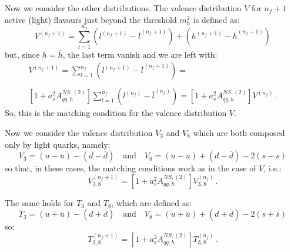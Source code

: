 \documentclass[10pt,a4paper]{article}
\begin{document}
Now we consider the other distributions. The valence distribution $V$
for $n_f+1$ active (light) flavours just beyond the threshold $m_h^2$
is defined as:
\begin{equation}
V^{(n_f+1)}=\sum_{l=1}^{n_f}(l^{(n_f+1)}-\overline{l}^{(n_f+1)})+(h^{(n_f+1)}-\overline{h}^{(n_f+1)})
\end{equation}
but, since $h=\overline{h}$, the last term vanish and we are left with:
\begin{equation}
\begin{array}{c}
\displaystyle V^{(n_f+1)}=\sum_{l=1}^{n_f}(l^{(n_f+1)}-\overline{l}^{(n_f+1)})=\\
\\
\displaystyle [1+a_s^2A_{qq,h}^{N\!S,(2)}]\sum_{l=1}^{n_f}(l^{(n_f)}-\overline{l}^{(n_f)})=[1+a_s^2A_{qq,h}^{N\!S,(2)}]V^{(n_f)}\,.
\end{array}
\label{valence}
\end{equation}
So, this is the matching condition for the valence distribution $V$.

Now we consider the valence distribution $V_3$ and $V_8$ which are
both composed only by light quarks, namely:
\begin{equation}
V_3=(u-\overline{u})-(d-\overline{d})\quad\mbox{and}\quad V_8=(u-\overline{u})+(d-\overline{d})-2(s-\overline{s})
\end{equation}
so that, in these cases, the matching conditions work as in the case
of $V$, i.e.:
\begin{equation}
V_{3,8}^{(n_f+1)}=[1+a_s^2A_{qq,h}^{N\!S,(2)}]V^{(n_f)}_{3,8}\,.
\label{v38}
\end{equation}

The same holds for $T_{3}$ and $T_8$, which are defined as:
\begin{equation}
T_3=(u+\overline{u})-(d+\overline{d})\quad\mbox{and}\quad V_8=(u+\overline{u})+(d+\overline{d})-2(s+\overline{s})
\end{equation}
so:
\begin{equation}
T_{3,8}^{(n_f+1)}=[1+a_s^2A_{qq,h}^{N\!S,(2)}]T^{(n_f)}_{3,8}\,.
\label{t38}
\end{equation}
\end{document}
